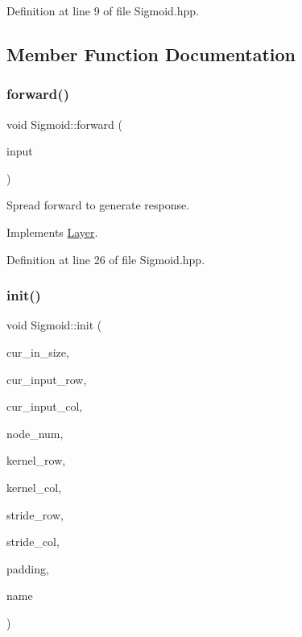 Definition at line 9 of file Sigmoid.\+hpp.



\subsection{Member Function Documentation}
\mbox{\label{class_sigmoid_adc63e77cbdcd74d1d4c452514a173c69}} 
\subsubsection{\texorpdfstring{forward()}{forward()}}
{\footnotesize\ttfamily void Sigmoid\+::forward (\begin{DoxyParamCaption}\item[{std\+::vector$<$ Eigen\+::\+Matrix\+Xd $>$}]{input }\end{DoxyParamCaption})\hspace{0.3cm}{\ttfamily [virtual]}}



Spread forward to generate response. 



Implements \hyperlink{class_layer_ac0b116d692ea457f8e7c0f79f7159004}{Layer}.



Definition at line 26 of file Sigmoid.\+hpp.

\mbox{\label{class_sigmoid_af70d4bfe6e3f507457067fc801256928}} 
\subsubsection{\texorpdfstring{init()}{init()}}
{\footnotesize\ttfamily void Sigmoid\+::init (\begin{DoxyParamCaption}\item[{int}]{cur\+\_\+in\+\_\+size,  }\item[{int}]{cur\+\_\+input\+\_\+row,  }\item[{int}]{cur\+\_\+input\+\_\+col,  }\item[{double}]{node\+\_\+num,  }\item[{double}]{kernel\+\_\+row,  }\item[{double}]{kernel\+\_\+col,  }\item[{double}]{stride\+\_\+row,  }\item[{double}]{stride\+\_\+col,  }\item[{std\+::string}]{padding,  }\item[{std\+::string}]{name }\end{DoxyParamCaption})\hspace{0.3cm}{\ttfamily [virtual]}}



